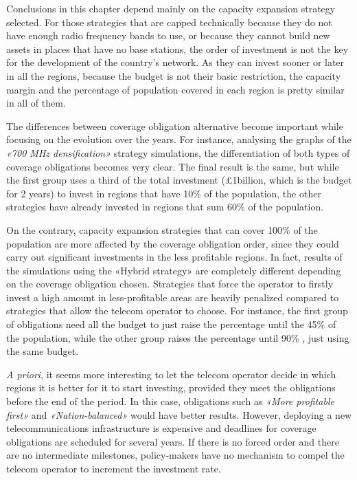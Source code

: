 Conclusions in this chapter depend mainly on the capacity expansion strategy selected. For those strategies that are capped technically because they do not have enough radio frequency bands to use, or because they cannot build new assets in places that have no base stations, the order of investment is not the key for the development of the country’s network. As they can invest sooner or later in all the regions, because the budget is not their basic restriction, the capacity margin and the percentage of population covered in each region is pretty similar in all of them.\par

The differences between coverage obligation alternative become important while focusing on the evolution over the years. For instance, analysing the graphs of the \textit{«700 MHz densification»} strategy simulations, the differentiation of both types of coverage obligations becomes very clear. The final result is the same, but while the first group uses a third of the total investment (£1billion, which is the budget for 2 years) to invest in regions that have 10$\%$  of the population, the other strategies have already invested in regions that sum 60$\%$  of the population.\par

On the contrary, capacity expansion strategies that can cover 100$\%$  of the population are more affected by the coverage obligation order, since they could carry out significant investments in the less profitable regions. In fact, results of the simulations using the «Hybrid strategy» are completely different depending on the coverage obligation chosen. Strategies that force the operator to firstly invest a high amount in less-profitable areas are heavily penalized compared to strategies that allow the telecom operator to choose. For instance, the first group of obligations need all the budget to just raise the percentage until the 45$\%$  of the population, while the other group raises the percentage until 90$\%$ , just using the same budget. \par

\textit{A priori}, it seems more interesting to let the telecom operator decide in which regions it is better for it to start investing, provided they meet the obligations before the end of the period. In this case, obligations such as \textit{«More profitable first»} and \textit{«Nation-balanced»} would have better results. However, deploying a new telecommunications infrastructure is expensive and deadlines for coverage obligations are scheduled for several years. If there is no forced order and there are no intermediate milestones, policy-makers have no mechanism to compel the telecom operator to increment the investment rate.\par

